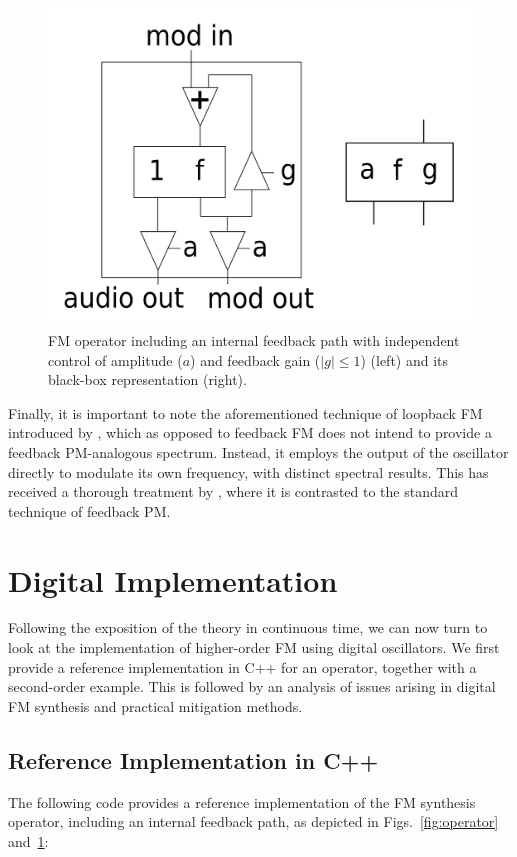 \documentclass[]{interact}
\begin{document}
\begin{figure}[htp]
\begin{center}
\includegraphics[width=.5\columnwidth]{operator-fdb.png}
\caption{FM operator including an internal feedback path with independent control of amplitude ($a$) and feedback gain ($|g| \leq 1$) (left) 
and its black-box representation (right).}
\label{fig:feedback-op}
\end{center}
\end{figure} 

Finally, it is important to note the aforementioned technique of loopback FM introduced by \cite{Loopback}, which as opposed to
feedback FM does not intend to provide a feedback PM-analogous spectrum. Instead, it employs
the output of the oscillator directly to modulate its own frequency, with distinct spectral results.
This has received a thorough treatment by \cite{Hsu}, where it is contrasted to the standard
technique of feedback PM.

\section{Digital Implementation}\label{sec:digital}

Following the exposition of the theory in continuous time, we can now turn to look at the implementation of higher-order FM using digital oscillators. We first provide a reference implementation in C++ for an operator, together with a second-order example. This is followed by an analysis of issues arising in digital FM synthesis and practical mitigation methods.

\subsection{Reference Implementation in C++}

The following code provides a reference implementation of the FM synthesis
operator, including an internal feedback path, as depicted in Figs.~\ref{fig:operator} and~\ref{fig:feedback-op}:
\end{document}
